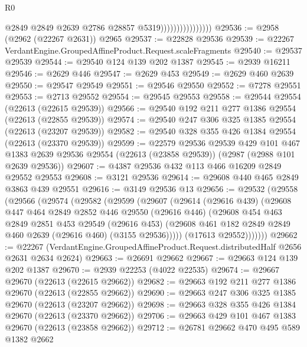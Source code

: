 \begin{lexlean}{R0}
\begin{coremodule}
                                    @2849
                                    @2849
                                    @2639
                                    @2786
                                    @28857
                                    @5319))))))))))))))))
@29536 := @2958 (@2962 (@22267 @2631)) @2965
@29537 := @22828 @29536
@29539 := @22267 VerdantEngine.GroupedAffineProduct.Request.scaleFragments
@29540 := @29537 @29539
@29544 := @29540 @124 @139 @202 @1387
@29545 := @2939 @16211
@29546 := @2629 @446
@29547 := @2629 @453
@29549 := @2629 @460 @2639
@29550 := @29547 @29549
@29551 := @29546 @29550
@29552 := @7278 @29551
@29553 := @2713 @29552
@29554 := @29545 @29553
@29558 := @29544 @29554 (@22613 (@22615 @29539))
@29566 := @29540 @192 @211 @277 @1386 @29554 (@22613 (@22855 @29539))
@29574 := @29540 @247 @306 @325 @1385 @29554 (@22613 (@23207 @29539))
@29582 := @29540 @328 @355 @426 @1384 @29554 (@22613 (@23370 @29539))
@29599 := @22579
    @29536
    @29539
    @429
    @101
    @467
    @1383
    @2639
    @29536
    @29554
    (@22613 (@23858 @29539))
    (@2987 (@2988 @101 @2639 @29536))
@29607 := @4387 @29536 @432 @113 @466 @16209 @2849 @29552 @29553
@29608 := @3121 @29536
@29614 := @29608 @440 @465 @2849 @3863 @439 @29551
@29616 := @3149 @29536 @13
@29656 := @29532
    (@29558
      (@29566
        (@29574
          (@29582
            (@29599
              (@29607
                (@29614
                  (@29616 @439)
                  (@29608
                    @447
                    @464
                    @2849
                    @2852
                    @446
                    @29550
                    (@29616 @446)
                    (@29608
                      @454
                      @463
                      @2849
                      @2851
                      @453
                      @29549
                      (@29616 @453)
                      (@29608 @461 @182 @2849 @2849 @460 @2639 (@29616 @460) (@3155 @29536)))))
                (@17613 @29552)))))))
@29662 := @22267
    (VerdantEngine.GroupedAffineProduct.Request.distributedHalf @2656 @2631 @2634 @2624)
@29663 := @26691 @29662
@29667 := @29663 @124 @139 @202 @1387
@29670 := @2939 @22253 (@4022 @22535)
@29674 := @29667 @29670 (@22613 (@22615 @29662))
@29682 := @29663 @192 @211 @277 @1386 @29670 (@22613 (@22855 @29662))
@29690 := @29663 @247 @306 @325 @1385 @29670 (@22613 (@23207 @29662))
@29698 := @29663 @328 @355 @426 @1384 @29670 (@22613 (@23370 @29662))
@29706 := @29663 @429 @101 @467 @1383 @29670 (@22613 (@23858 @29662))
@29712 := @26781 @29662 @470 @495 @589 @1382 @2662

\end{coremodule}
\end{lexlean}
